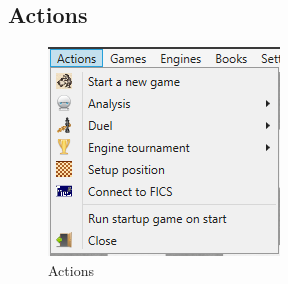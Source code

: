 \documentclass[11pt,a4paper]{article}
\begin{document}
\subsection{Actions}
\begin{figure}[H]
	\centering
	\includegraphics[scale=1.0]{Actions.png}
	\caption{Actions}
	\label{fig:Actions}
\end{figure}
\end{document}
